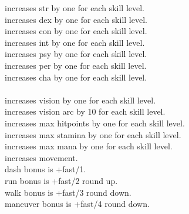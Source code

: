  increases str by one for each skill level. \\
 increases dex by one for each skill level. \\
 increases con by one for each skill level. \\
 increases int by one for each skill level. \\
 increases psy by one for each skill level. \\
 increases per by one for each skill level. \\
 increases cha by one for each skill level. \\
 \\
 increases vision by one for each skill level. \\
 increases vision arc by 10 for each skill level. \\
 increases max hitpoints by one for each skill level. \\
 increases max stamina by one for each skill level. \\
 increases max mana by one for each skill level. \\
 increases movement. \\
dash bonus is +fast/1. \\
run bonus is +fast/2 round up. \\
walk bonus is +fast/3 round down. \\
maneuver bonus is +fast/4 round down.


\closeskillslist
























